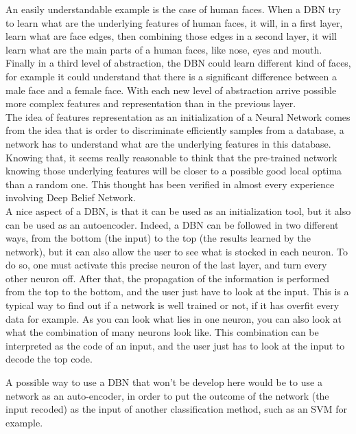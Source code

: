 \documentclass{report}
\begin{document}
		An easily understandable example is the case of human faces. When a DBN try to learn what are the underlying features of human faces, it will, in a first layer, learn what are face edges, then combining those edges in a second layer, it will learn what are the main parts of a human faces, like nose, eyes and mouth. Finally in a third level of abstraction, the DBN could learn different kind of faces, for example it could understand that there is a significant difference between a male face and a female face. With each new level of abstraction arrive possible more complex features and representation than in the previous layer. \\
		
		The idea of features representation as an initialization of a Neural Network comes from the idea that is order to discriminate efficiently samples from a database, a network has to understand what are the underlying features in this database. Knowing that, it seems really reasonable to think that the pre-trained network knowing those underlying features will be closer to a possible good local optima than a random one. This thought has been verified in almost every experience involving Deep Belief Network.\\
		
		A nice aspect of a DBN, is that it can be used as an initialization tool, but it also can be used as an autoencoder. Indeed, a DBN can be followed in two different ways, from the bottom (the input) to the top (the results learned by the network), but it can also allow the user to see what is stocked in each neuron. To do so, one must activate this precise neuron of the last layer, and turn every other neuron off. After that, the propagation of the information is performed from the top to the bottom, and the user just have to look at the input. This is a typical way to find out if a network is well trained or not, if it has overfit every data for example. As you can look what lies in one neuron, you can also look at what the combination of many neurons look like. This combination can be interpreted as the code of an input, and the user just has to look at the input to decode the top code.
		
		
		A possible way to use a DBN that won't be develop here would be to use a network as an auto-encoder, in order to put the outcome of the network (the input recoded) as the input of another classification method, such as an SVM for example.\\
		
\end{document}
